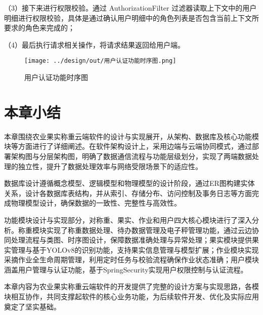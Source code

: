 （3）接下来进行权限校验。通过 AuthorizationFilter 过滤器读取上下文中的用户明细进行权限校验，具体是通过确认用户明细中的角色列表是否包含当前上下文所要求的角色来完成的；

（4）最后执行请求相关操作，将请求结果返回给用户端。

\begin{figure}
    \centering
    \texttt{[image: ../design/out/用户认证功能时序图.png]}
    \caption{用户认证功能时序图}
    \label{fig:用户认证功能时序图}
\end{figure}

\section{本章小结}

本章围绕农业果实称重云端软件的设计与实现展开，从架构、数据库及核心功能模块等方面进行了详细阐述。在软件架构设计上，采用边端与云端协同模式，通过部署架构图与分层架构图，明确了数据通信流程与功能层级划分，实现了两端数据处理的独立性，提升了数据处理效率与网络受限场景下的适应性。

数据库设计遵循概念模型、逻辑模型和物理模型的设计阶段，通过ER图构建实体关系，设计各数据库表结构，并从索引、存储分布、访问控制及事务日志等方面完成物理模型设计，确保数据的一致性、完整性与高效性。

功能模块设计与实现部分，对称重、果实、作业和用户四大核心模块进行了深入分析。称重模块实现了称重数据处理、待办数据管理及电子秤管理功能，通过云边协同处理流程与类图、时序图设计，保障数据准确处理与异常处理；果实模块提供果实管理与基于YOLOv8的识别功能，支持果实信息管理与模型扩展；作业模块实现采摘作业全生命周期管理，利用定时任务与校验流程确保作业状态准确；用户模块涵盖用户管理与认证功能，基于SpringSecurity实现用户权限控制与认证流程。

本章内容为农业果实称重云端软件的开发提供了完整的设计方案与实现思路，各模块相互协作，共同支撑起软件的核心业务功能，为后续软件开发、优化及实际应用奠定了坚实基础。


